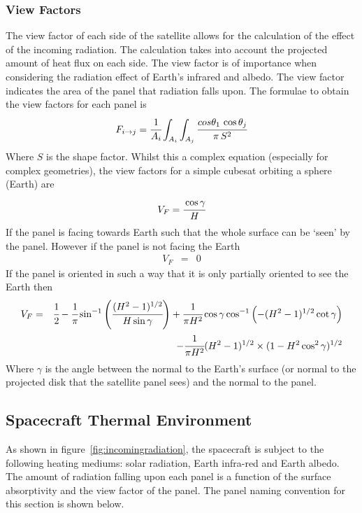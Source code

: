 \subsubsection{View Factors}\label{sec:viewfactors}
The view factor of each side of the satellite allows for the calculation of the effect of the incoming radiation. The calculation takes into account the projected amount of heat flux on each side. The view factor is of importance when considering the radiation effect of Earth's infrared and albedo. The view factor indicates the area of the panel that  radiation falls upon. The formulae to obtain the view factors for each panel is 
\begin{equation}
    F_{i\rightarrow j} = \cfrac{1}{A_i}\int_{A_i} \int_{A_j} \cfrac{cos \theta_1\,\cos\theta_j}{\pi\,S^2} 
\end{equation}
\noindent
Where $S$ is the shape factor. Whilst this a complex equation (especially for complex geometries), the view factors for a simple cubesat orbiting a sphere (Earth) are
\begin{equation}
    V_F = \cfrac{\cos\gamma}{H}
\end{equation}
\noindent 
If the panel is facing towards Earth such that the whole surface can be `seen' by the panel. However if the panel is not facing the Earth
\begin{eqnarray}
    V_F &=& 0 
\end{eqnarray}
\noindent
If the panel is oriented in such a way that it is only partially oriented to see the Earth then
\begin{eqnarray}
    V_F &=& \cfrac{1}{2}-\cfrac{1}{\pi}\sin^{-1}\left(\cfrac{(H^2-1)^{1/2}}{H\sin\gamma}\right) + \cfrac{1}{\pi H^2}\cos\gamma\cos^{-1}\left(-(H^2-1)^{1/2}\cot\gamma\right) \\
    &\,&\qquad -\cfrac{1}{\pi H^2}(H^2-1)^{1/2}\times(1-H^2\cos^2\gamma)^{1/2}
\end{eqnarray}
\noindent
Where $\gamma$ is the angle between the normal to the Earth's surface (or normal to the projected disk that the satellite panel sees) and the normal to the panel. \cite{heidt2000cubesat}

\begin{figure}[H]
\end{figure}



\subsection{Spacecraft Thermal Environment}
As shown in figure~\ref{fig:incomingradiation}, the spacecraft is subject to the following heating mediums: solar radiation, Earth infra-red and Earth albedo. The amount of radiation falling upon each panel is a function of the surface absorptivity and the view factor of the panel. The panel naming convention for this section is shown below.

